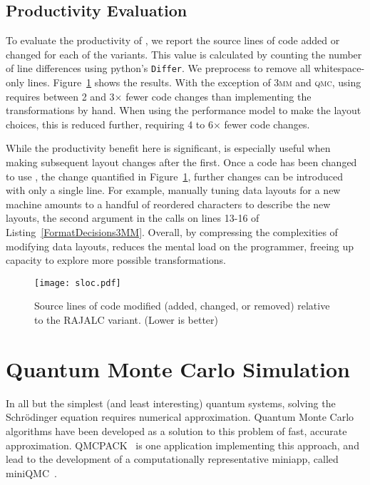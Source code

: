 \subsection{Productivity Evaluation}

To evaluate the productivity of \FormatDecisions{}, we report the source lines of code added or changed for each of the variants.
This value is calculated by counting the number of line differences using python's \verb.Differ.. 
We preprocess to remove all whitespace-only lines.
Figure~\ref{PolybenchSLOC} shows the results.
With the exception of \textsc{3mm} and \textsc{qmc}, using \FormatDecisions{} requires between 2 and 3$\times$ fewer code changes than implementing the transformations by hand. 
When using the performance model to make the layout choices, this is reduced further, requiring 4 to 6$\times$ fewer code changes. 

While the productivity benefit here is significant, \FormatDecisions{} is especially useful when making subsequent layout changes after the first. 
Once a code has been changed to use \FormatDecisions{}, the change quantified in Figure~\ref{PolybenchSLOC}, further changes can be introduced with only a single line. 
For example, manually tuning data layouts for a new machine amounts to a handful of reordered characters to describe the new layouts, the second argument in the calls on lines 13-16 of Listing~\ref{FormatDecisions3MM}. 
Overall, by compressing the complexities of modifying data layouts, \FormatDecisions{} reduces the mental load on the programmer, freeing up capacity to explore more possible transformations.

\begin{figure}
	\texttt{[image: sloc.pdf]}
	\caption{Source lines of code modified (added, changed, or removed) relative to the  RAJALC variant. (Lower is better)}
	\label{PolybenchSLOC}  

\end{figure}

\section{Quantum Monte Carlo Simulation}
\label{sec:miniQMC}
In all but the simplest (and least interesting) quantum systems, solving the Schr\"odinger equation requires numerical approximation. 
Quantum Monte Carlo algorithms have been developed as a solution to this problem of fast, accurate approximation.
QMCPACK~\cite{kim2018qmcpack} is one application implementing this approach, and lead to the development of a computationally representative miniapp, called miniQMC~\cite{richards2018fy18}.

